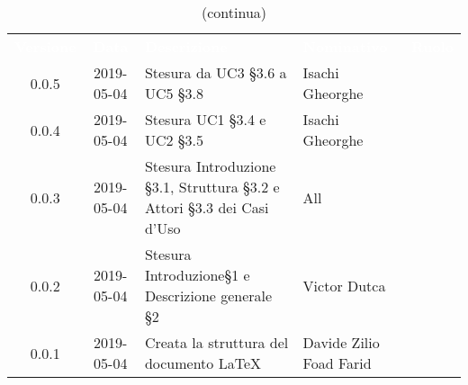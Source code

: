 {\begin{table}[H]
\begin{tabular}{c c  C{4cm} C{3cm}  c }
\end{tabular}
\end{table}


\begin{table}[H]
\centering\renewcommand{\arraystretch}{1.5}
\caption{(continua)}
\vspace{0.2cm}
\begin{tabular}{c c  C{4cm} C{3cm}  c }
\textcolor{white}{\textbf{Versione}} & \textcolor{white}{\textbf{Data}} & \textcolor{white}{\textbf{Descrizione}} & \textcolor{white}{\textbf{Nominativo}} & \textcolor{white}{\textbf{Ruolo}}\\

0.0.5 & 2019-05-04 & Stesura da UC3 \S{3.6} a UC5 \S{3.8} & Isachi Gheorghe &\reda{}\\	
0.0.4 & 2019-05-04 & Stesura UC1 \S{3.4} e UC2 \S{3.5} & Isachi Gheorghe &\reda{}\\	
0.0.3 & 2019-05-04 & Stesura Introduzione \S{3.1}, Struttura \S{3.2} e Attori \S{3.3} dei Casi d'Uso & All &\reda{}\\	
0.0.2 & 2019-05-04 & Stesura Introduzione\S{1} e Descrizione generale \S{2} & Victor Dutca &\reda{}\\	
0.0.1 & 2019-05-04 & Creata la struttura del documento \LaTeX & Davide Zilio Foad Farid &\reda{}\\	
		
\end{tabular}
\end{table}


}